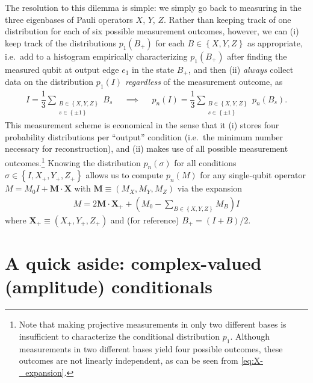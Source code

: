 \documentclass[nofootinbib,notitlepage,11pt]{revtex4-2}
\newcommand{\f}[2]{\dfrac{#1}{#2}} %
\newcommand{\p}[1]{\left(#1\right)} %
\renewcommand{\set}[1]{\left\{#1\right\}} %
\renewcommand{\v}{\bm} %
\renewcommand{\c}{\cdot} %
\begin{document}
The resolution to this dilemma is simple: we simply go back to
measuring in the three eigenbases of Pauli operators $X$, $Y$, $Z$.
Rather than keeping track of one distribution for each of six possible
measurement outcomes, however, we can (i) keep track of the
distributions $p_1\p{B_+}$ for each $B\in\set{X,Y,Z}$ as appropriate,
i.e.~add to a histogram empirically characterizing $p_1\p{B_+}$ after
finding the measured qubit at output edge $e_1$ in the state $B_+$,
and then (ii) {\it always} collect data on the distribution $p_1\p{I}$
{\it regardless} of the measurement outcome, as
\begin{align}
  I = \f13 \sum_{\substack{B\in\set{X,Y,Z}\\s\in\set{\pm1}}} B_s
  &&
  \implies
  &&
  p_n\p{I} = \f13 \sum_{\substack{B\in\set{X,Y,Z}\\s\in\set{\pm1}}}
  p_n\p{B_s}.
\end{align}
This measurement scheme is economical in the sense that it (i) stores
four probability distributions per ``output'' condition (i.e.~the
minimum number necessary for reconstruction), and (ii) makes use of
all possible measurement outcomes.\footnote{Note that making
  projective measurements in only two different bases is insufficient
  to characterize the conditional distribution $p_1$.  Although
  measurements in two different bases yield four possible outcomes,
  these outcomes are not linearly independent, as can be seen from
  \eqref{eq:X-_expansion}.}  Knowing the distribution $p_n\p{\sigma}$
for all conditions $\sigma\in\set{I,X_+,Y_+,Z_+}$ allows us to compute
$p_n\p{M}$ for any single-qubit operator $M = M_0 I + \v M\c\v X$ with
$\v M\equiv\p{M_X,M_Y,M_Z}$ via the expansion
\begin{align}
  M = 2 \v M\c\v X_+ + \p{ M_0 - \sum_{B\in\set{X,Y,Z}} M_B } I
\end{align}
where $\v X_+\equiv\p{X_+,Y_+,Z_+}$ and (for reference)
$B_+=\p{I+B}/2$.


\section{A quick aside: complex-valued (amplitude) conditionals}
\label{sec:amplitudes}
\end{document}
